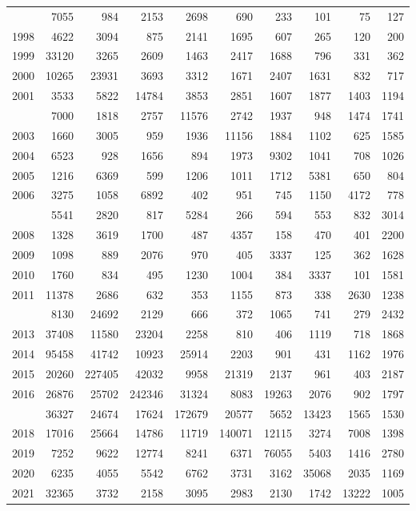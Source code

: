 \documentclass[
]{article}
\begin{document}
\begin{longtable}[t]{lrrrrrrrrr}
\addlinespace
1997 & 7055 & 984 & 2153 & 2698 & 690 & 233 & 101 & 75 & 127\\
1998 & 4622 & 3094 & 875 & 2141 & 1695 & 607 & 265 & 120 & 200\\
1999 & 33120 & 3265 & 2609 & 1463 & 2417 & 1688 & 796 & 331 & 362\\
2000 & 10265 & 23931 & 3693 & 3312 & 1671 & 2407 & 1631 & 832 & 717\\
2001 & 3533 & 5822 & 14784 & 3853 & 2851 & 1607 & 1877 & 1403 & 1194\\
\addlinespace
2002 & 7000 & 1818 & 2757 & 11576 & 2742 & 1937 & 948 & 1474 & 1741\\
2003 & 1660 & 3005 & 959 & 1936 & 11156 & 1884 & 1102 & 625 & 1585\\
2004 & 6523 & 928 & 1656 & 894 & 1973 & 9302 & 1041 & 708 & 1026\\
2005 & 1216 & 6369 & 599 & 1206 & 1011 & 1712 & 5381 & 650 & 804\\
2006 & 3275 & 1058 & 6892 & 402 & 951 & 745 & 1150 & 4172 & 778\\
\addlinespace
2007 & 5541 & 2820 & 817 & 5284 & 266 & 594 & 553 & 832 & 3014\\
2008 & 1328 & 3619 & 1700 & 487 & 4357 & 158 & 470 & 401 & 2200\\
2009 & 1098 & 889 & 2076 & 970 & 405 & 3337 & 125 & 362 & 1628\\
2010 & 1760 & 834 & 495 & 1230 & 1004 & 384 & 3337 & 101 & 1581\\
2011 & 11378 & 2686 & 632 & 353 & 1155 & 873 & 338 & 2630 & 1238\\
\addlinespace
2012 & 8130 & 24692 & 2129 & 666 & 372 & 1065 & 741 & 279 & 2432\\
2013 & 37408 & 11580 & 23204 & 2258 & 810 & 406 & 1119 & 718 & 1868\\
2014 & 95458 & 41742 & 10923 & 25914 & 2203 & 901 & 431 & 1162 & 1976\\
2015 & 20260 & 227405 & 42032 & 9958 & 21319 & 2137 & 961 & 403 & 2187\\
2016 & 26876 & 25702 & 242346 & 31324 & 8083 & 19263 & 2076 & 902 & 1797\\
\addlinespace
2017 & 36327 & 24674 & 17624 & 172679 & 20577 & 5652 & 13423 & 1565 & 1530\\
2018 & 17016 & 25664 & 14786 & 11719 & 140071 & 12115 & 3274 & 7008 & 1398\\
2019 & 7252 & 9622 & 12774 & 8241 & 6371 & 76055 & 5403 & 1416 & 2780\\
2020 & 6235 & 4055 & 5542 & 6762 & 3731 & 3162 & 35068 & 2035 & 1169\\
2021 & 32365 & 3732 & 2158 & 3095 & 2983 & 2130 & 1742 & 13222 & 1005\\*
\end{longtable}
\end{document}
